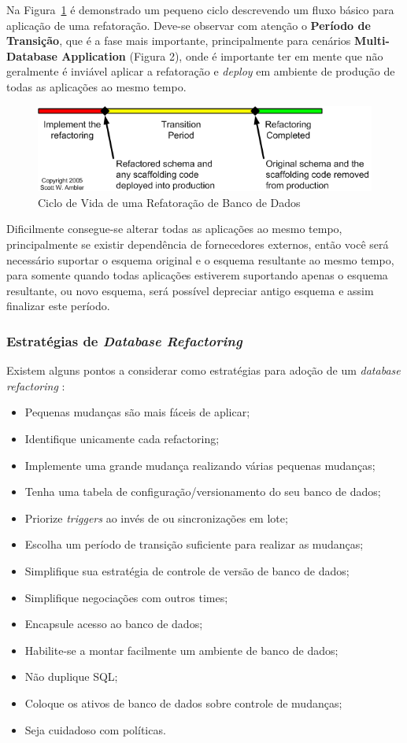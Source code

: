 \documentclass[10pt]{article}
\begin{document}
	Na Figura~\ref{figura:4} é demonstrado um pequeno ciclo descrevendo um fluxo básico para aplicação de uma refatoração. Deve-se observar com atenção o \textbf{Período de Transição}, que é a fase mais importante, principalmente para cenários \textbf{Multi-Database Application} (Figura 2), onde é importante ter em mente que não geralmente é inviável aplicar a refatoração e \textit{deploy} em ambiente de produção de todas as aplicações ao mesmo tempo. 

	\begin{figure}[ht]
		\centering
		\includegraphics[width=.5\textwidth]{img/databaseRefactoringLifecycle.png}
		\caption{Ciclo de Vida de uma Refatoração de Banco de Dados}
		\label{figura:4}
	\end{figure}

	Dificilmente consegue-se alterar todas as aplicações ao mesmo tempo, principalmente se existir dependência de fornecedores externos, então você será necessário suportar o esquema original e o esquema resultante ao mesmo tempo, para somente quando todas aplicações estiverem suportando apenas o esquema resultante, ou novo esquema, será possível depreciar antigo esquema e assim finalizar este período.

\subsubsection{Estratégias de \textit{Database Refactoring}}\label{subsec:estrategiasdatabaserefactoring}
	Existem alguns pontos a considerar como estratégias para adoção de um \textit{database refactoring} \cite{Ambler:RefactoringDatabases}:
	\begin{itemize}
		\item Pequenas mudanças são mais fáceis de aplicar;
		\item Identifique unicamente cada refactoring;
		\item Implemente uma grande mudança realizando várias pequenas mudanças;
		\item Tenha uma tabela de configuração/versionamento do seu banco de dados;
		\item Priorize \textit{triggers} ao invés de  ou sincronizações em lote;
		\item Escolha um período de transição suficiente para realizar as mudanças;
		\item Simplifique sua estratégia de controle de versão de banco de dados;
		\item Simplifique negociações com outros times;
		\item Encapsule acesso ao banco de dados;
		\item Habilite-se a montar facilmente um ambiente de banco de dados;
		\item Não duplique SQL;
		\item Coloque os ativos de banco de dados sobre controle de mudanças;
		\item Seja cuidadoso com políticas.
	\end{itemize}
\end{document}
